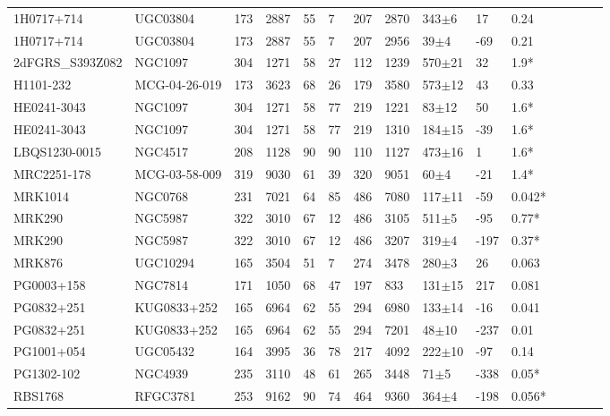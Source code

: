 \documentclass[iop]{emulateapj-rtx4}
\begin{document}
\begin{table}[ht]
\begin{center}
\begin{tabular}{l l l l l l l l l l l l l l l}
1H0717+714  &  UGC03804  &  173  &  2887  &  55  &  7  &  207  &  2870  &  343$\pm$6  &  17  &  0.24  \\
1H0717+714  &  UGC03804  &  173  &  2887  &  55  &  7  &  207  &  2956  &  39$\pm$4  &  -69  &  0.21  \\
2dFGRS\_S393Z082  &  NGC1097  &  304  &  1271  &  58  &  27  &  112  &  1239  &  570$\pm$21  &  32  &  1.9*  \\
H1101-232  &  MCG-04-26-019  &  173  &  3623  &  68  &  26  &  179  &  3580  &  573$\pm$12  &  43  &  0.33  \\
HE0241-3043  &  NGC1097  &  304  &  1271  &  58  &  77  &  219  &  1221  &  83$\pm$12  &  50  &  1.6*  \\
HE0241-3043  &  NGC1097  &  304  &  1271  &  58  &  77  &  219  &  1310  &  184$\pm$15  &  -39  &  1.6*  \\
LBQS1230-0015  &  NGC4517  &  208  &  1128  &  90  &  90  &  110  &  1127  &  473$\pm$16  &  1  &  1.6*  \\
MRC2251-178  &  MCG-03-58-009  &  319  &  9030  &  61  &  39  &  320  &  9051  &  60$\pm$4  &  -21  &  1.4*  \\
MRK1014  &  NGC0768  &  231  &  7021  &  64  &  85  &  486  &  7080  &  117$\pm$11  &  -59  &  0.042*  \\
MRK290  &  NGC5987  &  322  &  3010  &  67  &  12  &  486  &  3105  &  511$\pm$5  &  -95  &  0.77*  \\
MRK290  &  NGC5987  &  322  &  3010  &  67  &  12  &  486  &  3207  &  319$\pm$4  &  -197  &  0.37*  \\
MRK876  &  UGC10294  &  165  &  3504  &  51  &  7  &  274  &  3478  &  280$\pm$3  &  26  &  0.063  \\
PG0003+158  &  NGC7814  &  171  &  1050  &  68  &  47  &  197  &  833  &  131$\pm$15  &  217  &  0.081  \\
PG0832+251  &  KUG0833+252  &  165  &  6964  &  62  &  55  &  294  &  6980  &  133$\pm$14  &  -16  &  0.041  \\
PG0832+251  &  KUG0833+252  &  165  &  6964  &  62  &  55  &  294  &  7201  &  48$\pm$10  &  -237  &  0.01  \\
PG1001+054  &  UGC05432  &  164  &  3995  &  36  &  78  &  217  &  4092  &  222$\pm$10  &  -97  &  0.14  \\
PG1302-102  &  NGC4939  &  235  &  3110  &  48  &  61  &  265  &  3448  &  71$\pm$5  &  -338  &  0.05*  \\
RBS1768  &  RFGC3781  &  253  &  9162  &  90  &  74  &  464  &  9360  &  364$\pm$4  &  -198  &  0.056*  \\

\end{tabular}
\end{center}
\end{table}
\end{document}
